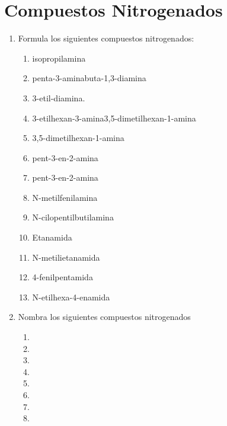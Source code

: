 \section{Compuestos Nitrogenados}

\begin{enumerate}
    \item Formula los siguientes compuestos nitrogenados:
          \begin{enumerate}
              \item isopropilamina
              \item penta-3-aminabuta-1,3-diamina
              \item 3-etil-diamina.
              \item 3-etilhexan-3-amina3,5-dimetilhexan-1-amina
              \item 3,5-dimetilhexan-1-amina
              \item pent-3-en-2-amina
              \item pent-3-en-2-amina
              \item N-metilfenilamina
              \item N-cilopentilbutilamina
              \item Etanamida
              \item N-metilietanamida
              \item 4-fenilpentamida
              \item N-etilhexa-4-enamida
          \end{enumerate}
    \item Nombra los siguientes compuestos nitrogenados
          \begin{enumerate}
              \item {}
              \item {}
              \item {}
              \item {}
              \item {}
              \item {}
              \item {}
              \item {}
          \end{enumerate}
\end{enumerate}
